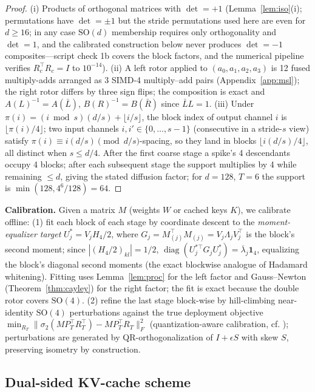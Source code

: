 \documentclass{article}
\newcommand{\SO}{\mathrm{SO}}
\newcommand{\norm}[1]{\lVert #1 \rVert}
\begin{document}
\begin{proof}
(i) Products of orthogonal matrices with $\det=+1$
(Lemma~\ref{lem:iso}(i); permutations have $\det=\pm1$ but the stride
permutations used here are even for $d\ge16$; in any case $\SO(d)$
membership requires only orthogonality and $\det=1$, and the calibrated
construction below never produces $\det=-1$ composites---script check 1b
covers the block factors, and the numerical pipeline verifies
$R_c^\top R_c=I$ to $10^{-14}$). (ii) A left rotor applied to
$(a_0,a_1,a_2,a_3)$ is 12 fused multiply-adds arranged as 3 SIMD-4
multiply--add pairs (Appendix~\ref{app:msl}); the right rotor differs by
three sign flips; the composition is exact and
$A(L)^{-1}=A(\bar L)$, $B(R)^{-1}=B(\bar R)$ since
$\bar LL=1$. (iii) Under $\pi(i)=(i\bmod s)(d/s)+\lfloor i/s\rfloor$, the
block index of output channel $i$ is $\lfloor\pi(i)/4\rfloor$; two input
channels $i,i'\in\{0,\dots,s-1\}$ (consecutive in a stride-$s$ view) satisfy
$\pi(i)\equiv i(d/s)\pmod{d/s}$-spacing, so they land in blocks
$\lfloor i(d/s)/4\rfloor$, all distinct when $s\le d/4$. After the first
coarse stage a spike's 4 descendants occupy 4 blocks; after each subsequent
stage the support multiplies by 4 while remaining $\le d$, giving the stated
diffusion factor; for $d=128$, $T=6$ the support is
$\min(128,4^{6}/128)=64$.
\end{proof}

\textbf{Calibration.} Given a matrix $M$ (weights $W$ or cached keys $K$), we
calibrate offline: (1) fit each block of each stage by coordinate descent to
the \emph{moment-equalizer target}
$U^{*}_j=V_jH_4/2$, where $G_j=M_{(j)}^\top M_{(j)}=V_j\Lambda_jV_j^\top$ is
the block's second moment; since $|(H_4/2)_{kl}|=1/2$,
$\operatorname{diag}(U^{*\top}_jG_jU^{*}_j)=\overline{\lambda}_j\mathbf{1}_4$,
equalizing the block's diagonal second moments (the exact blockwise analogue
of Hadamard whitening). Fitting uses Lemma~\ref{lem:proc} for the left factor
and Gauss--Newton (Theorem~\ref{thm:cayley}) for the right factor; the fit is
exact because the double rotor covers $\SO(4)$. (2) refine the last stage
block-wise by hill-climbing near-identity $\SO(4)$ perturbations against the
true deployment objective
$\min_{R_T}\norm{\sigma_2(MP_T^\top R_T^\top)-MP_T^\top R_T}_F^2$
(quantization-aware calibration, cf. \citep{tseng2024quipsharp,su2025rotatekv});
perturbations are generated by QR-orthogonalization of $I+\epsilon S$ with
skew $S$, preserving isometry by construction.

\subsection{Dual-sided KV-cache scheme}
\label{sec:kv}
\end{document}
